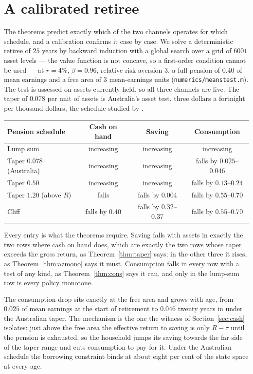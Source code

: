 \section{A calibrated retiree}\label{sec:num}

The theorems predict exactly which of the two channels operates for which schedule, and a
calibration confirms it case by case. We solve a deterministic retiree of $25$ years by backward
induction with a global search over a grid of $6001$ asset levels --- the value function is not
concave, so a first-order condition cannot be used --- at $r=4\%$, $\beta=0.96$, relative risk
aversion $3$, a full pension of $0.40$ of mean earnings and a free area of $3$ mean-earnings units
(\texttt{numerics/meanstest.m}). The test is assessed on assets currently held, so all three
channels are live. The taper of $0.078$ per unit of assets is Australia's asset test, three dollars
a fortnight per thousand dollars, the schedule studied by \citet{KudrnaWoodland2011}.

\begingroup\small
\begin{center}
\begin{tabular}{@{}lccc@{}}
\toprule
Pension schedule & Cash on hand & Saving & Consumption \\
\midrule
Lump sum & increasing & increasing & increasing \\
Taper $0.078$ (Australia) & increasing & increasing & falls by $0.025$--$0.046$ \\
Taper $0.50$ & increasing & increasing & falls by $0.13$--$0.24$ \\
Taper $1.20$ (above $R$) & falls & falls by $0.004$ & falls by $0.55$--$0.70$ \\
Cliff & falls by $0.40$ & falls by $0.32$--$0.37$ & falls by $0.55$--$0.70$ \\
\bottomrule
\end{tabular}
\end{center}
\endgroup

Every entry is what the theorems require. Saving falls with assets in exactly the two rows where
cash on hand does, which are exactly the two rows whose taper exceeds the gross return, as
Theorem~\ref{thm:taper} says; in the other three it rises, as Theorem~\ref{thm:azmono} says it
must. Consumption falls in every row with a test of any kind, as Theorem~\ref{thm:cons} says it
can, and only in the lump-sum row is every policy monotone.

The consumption drop sits exactly at the free area and grows with age, from $0.025$ of mean
earnings at the start of retirement to $0.046$ twenty years in under the Australian taper. The
mechanism is the one the witness of Section~\ref{sec:cash} isolates: just above the free area the
effective return to saving is only $R-\tau$ until the pension is exhausted, so the household jumps
its saving towards the far side of the taper range and cuts consumption to pay for it. Under the
Australian schedule the borrowing constraint binds at about eight per cent of the state space at
every age.

